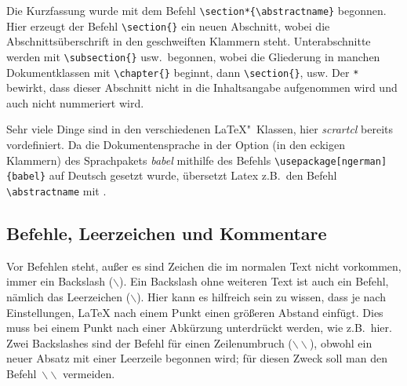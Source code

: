 Die Kurzfassung wurde mit dem Befehl \verb"\section*{\abstractname}" begonnen. Hier erzeugt der Befehl \verb"\section{}" ein neuen Abschnitt, wobei die Abschnittsüberschrift in den geschweiften Klammern steht. Unterabschnitte werden mit \verb"\subsection{}" usw.\ begonnen, wobei die Gliederung in manchen Dokumentklassen mit \verb"\chapter{}" beginnt, dann \verb"\section{}", usw.  Der \verb"*" bewirkt, dass dieser Abschnitt nicht in die Inhaltsangabe aufgenommen wird und auch nicht nummeriert wird.

Sehr viele Dinge sind in den verschiedenen \LaTeX"~Klassen, hier \textit{scrartcl} bereits vordefiniert. Da die Dokumentensprache in der Option (in den eckigen Klammern) des Sprachpakets \textit{babel} mithilfe des Befehls \verb"\usepackage[ngerman]{babel}" auf Deutsch gesetzt wurde, übersetzt Latex z.B.\ den Befehl \verb"\abstractname" mit \abstractname.
%
\subsection{Befehle, Leerzeichen und Kommentare}
\label{subsec:TextBefehle}
Vor Befehlen steht, außer es sind Zeichen die im normalen Text nicht vorkommen, immer ein Backslash ($\backslash$). 
Ein Backslash ohne weiteren Text ist auch ein Befehl, nämlich 
das Leerzeichen ($\backslash$). 
Hier kann es hilfreich sein zu wissen, dass je nach Einstellungen, \LaTeX{} nach einem Punkt einen größeren Abstand einfügt. Dies muss bei einem Punkt nach einer Abkürzung unterdrückt werden, wie z.B.\ hier. Zwei Backslashes sind der Befehl für einen Zeilenumbruch ($\backslash\backslash$), obwohl ein neuer Absatz mit einer Leerzeile begonnen wird; für diesen Zweck soll man den Befehl~$\backslash\backslash$ vermeiden. %


